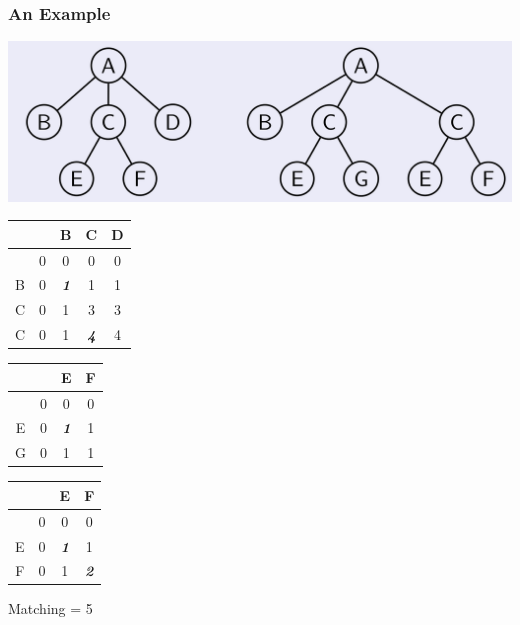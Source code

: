 \documentclass[svgnames]{beamer}
\begin{document}
\begin{frame} \frametitle{An Example}

  \begin{block}{}
      \centering
      \includegraphics[width=.8\linewidth]{simple-tree-matching}
  \end{block}

  \vfill

  \centering

  \begin{tabular}{c|cccc}
      &   & B & C & D \\\hline
      & 0 & 0 & 0 & 0 \\
    B & 0 & \emph{\textbf{1}} & 1 & 1 \\
    C & 0 & 1 & 3 & 3 \\
    C & 0 & 1 & \emph{\textbf{4}} & 4 \\
  \end{tabular}\hfill
  \begin{tabular}{c|ccc}
      &   & E & F \\\hline
      & 0 & 0 & 0 \\
    E & 0 & \emph{\textbf{1}} & 1 \\
    G & 0 & 1 & 1 \\
  \end{tabular}\hfill
  \begin{tabular}{c|ccc}
      &   & E & F \\\hline
      & 0 & 0 & 0 \\
    E & 0 & \emph{\textbf{1}} & 1 \\
    F & 0 & 1 & \emph{\textbf{2}} \\
  \end{tabular}

  \alert{Matching = 5}\\[\baselineskip]
  

\end{frame}

\end{document}
